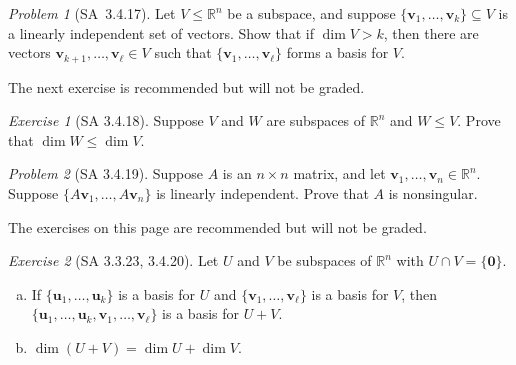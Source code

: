\documentclass[fleqn,11pt]{paper}
\theoremstyle{remark}
\newtheorem{problem}{Problem}
\newtheorem*{exercise}{Exercise}
\newtheorem*{solution}{{\bf Solution}}
\newcommand\R{\fld{R}}
\renewcommand{\dim}{\ensuremath{\operatorname{dim}}}
\renewcommand{\vec}[1]{\mathbf{#1}}
\newcommand{\<}{\ensuremath{\langle}}
\renewcommand{\>}{\ensuremath{\rangle}}
\newcommand\fld[1]{\ensuremath{\mathbb{#1}}}
\newcommand\vu{\vec{u}}
\newcommand\vv{\vec{v}}
\newcommand\vzero{\vec{0}}
\begin{document}
\begin{problem}[SA~3.4.17] 
Let $V \leq \R^n$ be a subspace, 
and suppose $\{\vv_1,\dots, \vv_k\}\subseteq V$ is a linearly independent set of vectors.
Show that if $\dim V > k$, then there are 
vectors $\vv_{k+1},\dots, \vv_\ell \in V$ such that 
$\{\vv_{1},\dots, \vv_\ell\}$ forms a basis for $V$.
\end{problem}

\newpage

\noindent The next exercise is recommended but will not be graded.
\begin{exercise}[SA 3.4.18]
Suppose $V$ and $W$ are subspaces of $\R^n$ and $W \leq V$. 
Prove that $\dim W \leq \dim V$. 
\end{exercise}

\newpage

\begin{problem}[SA 3.4.19] 
Suppose $A$ is an $n \times n$ matrix, and let $\vv_1,\dots, \vv_n \in \R^n$. 
Suppose $\{A\vv_1,\dots, A\vv_n\}$ is linearly independent. 
Prove that $A$ is nonsingular.
\end{problem}

\newpage

\noindent The exercises on this page are recommended but will not be graded.
\begin{exercise}[SA 3.3.23, 3.4.20]
Let $U$ and $V$ be subspaces of $\R^n$ with $U \cap V =\{\vzero\}$.
\begin{enumerate}[(a)]
\item If $\{\vu_1, \dots, \vu_k\}$ is a basis for $U$ 
and $\{\vv_1, \dots, \vv_\ell\}$ is a basis for $V$, then  
$\{\vu_1, \dots, \vu_k, \vv_1, \dots, \vv_\ell\}$ is a basis for $U + V$.
\item $\dim(U + V) = \dim U + \dim V$.
\end{enumerate}
\end{exercise}
\end{document}
